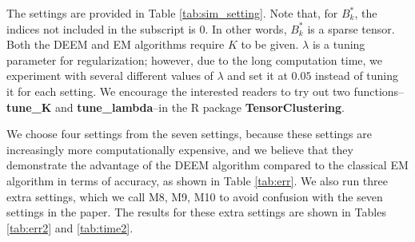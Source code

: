 \documentclass[11pt]{article}
\begin{document}
The settings are provided in Table \ref{tab:sim_setting}. Note that, for ${B}^*_{k}$, the indices not included in the subscript is $0$. In other words, ${B}^*_k$ is a sparse tensor. Both the DEEM and EM algorithms require $K$ to be given. $\lambda$ is a tuning parameter for regularization; however, due to the long computation time, we experiment with several different values of $\lambda$ and set it at $0.05$ instead of tuning it for each setting. We encourage the interested readers to try out two functions--\textbf{tune\_K} and \textbf{tune\_lambda}--in the R package \textbf{TensorClustering}. 

We choose four settings from the seven settings, because these settings are increasingly more computationally expensive, and we believe that they demonstrate the advantage of the DEEM algorithm compared to the classical EM algorithm in terms of accuracy, as shown in Table \ref{tab:err}. We also run three extra settings, which we call M8, M9, M10 to avoid confusion with the seven settings in the paper. The results for these extra settings are shown in Tables \ref{tab:err2} and \ref{tab:time2}.
\end{document}
